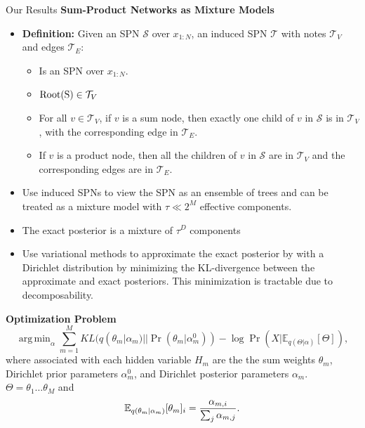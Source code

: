 \documentclass[final]{beamer}
\newlength{\onecolwid}
\newcommand{\cmuRed}[1]{\textcolor{CMURed}{#1}}
\newcommand{\cmuRedB}[1]{\textcolor{CMURed}{\textbf{#1}}}
\newcommand{\EE}{\mathbb{E}}
\DeclareMathOperator*{\argmin}{arg\,min}
\begin{document}
\begin{frame}[t]
\begin{columns}[t]
\begin{column}{\onecolwid}
\begin{block}{Our Results}
        \cmuRedB{Sum-Product Networks as Mixture Models}

        \begin{itemize}
        \item \cmuRedB{Definition:}
          Given an SPN $\mathcal{S}$ over $x_{1:N}$,
          an \cmuRed{induced SPN} $\mathcal{T}$ with
          notes $\mathcal{T}_V$ and edges $\mathcal{T}_E$:
          \begin{itemize}
          \item Is an SPN over $x_{1:N}$.
          \item ${\rm Root(S)} \in \mathcal{T}_V$
          \item For all $v\in \mathcal{T}_V$, if $v$ is a sum node,
            then exactly one child of $v$ in $\mathcal{S}$ is in $\mathcal{T}_V$,
            with the corresponding edge in $\mathcal{T}_E$.
          \item If $v$ is a product node, then all the children
            of $v$ in $\mathcal{S}$ are in $\mathcal{T}_V$ and
            the corresponding edges are in $\mathcal{T}_E$.
          \end{itemize}
        \item Use induced SPNs to view the SPN as an \cmuRed{ensemble of trees}
          and can be treated as a mixture model with $\tau\ll 2^M$ effective
          components.
        \item The \cmuRed{exact posterior} is a mixture of $\tau^D$
          components
        \item Use variational methods to \cmuRed{approximate} the exact posterior
          by with a Dirichlet distribution by
          \cmuRed{minimizing the KL-divergence} between
          the approximate and exact posteriors.
          This minimization \cmuRed{is tractable} due to decomposability.
        \end{itemize}

        \cmuRedB{Optimization Problem}
        \begin{equation*}
          \argmin_\alpha \sum_{m=1}^M KL(q(\theta_m|\alpha_m) || \Pr(\theta_m|\alpha_m^0))
          - \log \Pr(X | \EE_{q(\Theta|\alpha)}[\Theta]),
        \end{equation*}
        where associated with each hidden variable $H_m$ are the
        the sum weights $\theta_m$, Dirichlet prior parameters $\alpha_m^0$,
        and Dirichlet posterior parameters $\alpha_m$.
        $\Theta = \theta_1 \ldots \theta_M$ and
        $$\EE_{q(\theta_m|\alpha_m)}[\theta_m] _i =
        {\alpha_{m,i} \over \sum_j \alpha_{m,j}}.$$


\end{block}
\end{column}
\end{columns}
\end{frame}
\end{document}
